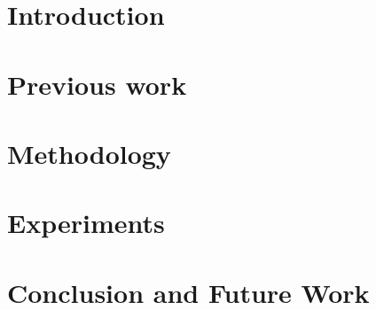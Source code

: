 \documentclass[10pt,twocolumn,letterpaper]{article}
\begin{document}
\section{Introduction}


%

\section{Previous work}
\label{sec_motivtn}




%

%

\section{Methodology}
\label{sec_method}


\section{Experiments}
\label{sec_exp}




\section{Conclusion and Future Work}
\label{sec_con}




{\small


}
\end{document}
